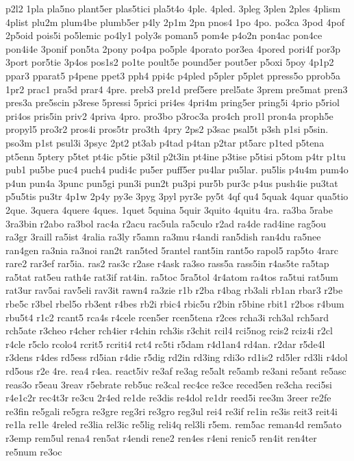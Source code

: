{p2l2
1pla
pla5no
plant5er
plas5tici
pla5t4o
4ple.
4pled.
3pleg
3plen
2ples
4plism
4plist
plu2m
plum4be
plumb5er
p4ly
2p1m
2pn
pnos4
1po
4po.
po3ca
3pod
4pof
2p5oid
pois5i
po5lemic
po4ly1
poly3s
poman5
pom4e
p4o2n
pon4ac
pon4ce
pon4i4e
3ponif
pon5ta
2pony
po4pa
po5ple
4porato
por3ea
4pored
pori4f
por3p
3port
por5tie
3p4os
pos1s2
po1te
poult5e
pound5er
pout5er
p5oxi
5poy
4p1p2
ppar3
pparat5
p4pene
ppet3
pph4
ppi4c
p4pled
p5pler
p5plet
ppress5o
pprob5a
1pr2
prac1
pra5d
prar4
4pre.
preb3
pre1d
pref5ere
prel5ate
3prem
pre5mat
pren3
pres3a
pre5scin
p3rese
5pressi
5prici
pri4es
4pri4m
pring5er
pring5i
4prio
p5riol
pri4os
pris5in
priv2
4priva
4pro.
pro3bo
p3roc3a
pro4ch
pro1l
pron4a
proph5e
propyl5
pro3r2
pros4i
pros5tr
pro3th
4pry
2ps2
p3sac
psal5t
p3sh
p1si
p5sin.
pso3m
p1st
psul3i
3psyc
2pt2
pt3ab
p4tad
p4tan
p2tar
pt5arc
p1ted
p5tena
pt5enn
5ptery
p5tet
pt4ic
p5tie
p3til
p2t3in
pt4ine
p3tise
p5tisi
p5tom
p4tr
p1tu
pub1
pu5be
puc4
puch4
pudi4c
pu5er
puff5er
pu4lar
pu5lar.
pu5lis
p4u4m
pum4o
p4un
pun4a
3punc
pun5gi
pun3i
pun2t
pu3pi
pur5b
pur3c
p4us
push4ie
pu3tat
p5u5tis
pu3tr
4p1w
2p4y
py3e
3pyg
3pyl
pyr3e
py5t
4qf
qu4
5quak
4quar
qua5tio
2que.
3quera
4quere
4ques.
1quet
5quina
5quir
3quito
4quitu
4ra.
ra3ba
5rabe
3ra3bin
r2abo
ra3bol
rac4a
r2acu
rac5ula
ra5culo
r2ad
ra4de
rad4ine
rag5ou
ra3gr
3raill
ra5ist
4ralia
ra3ly
r5amn
ra3mu
r4andi
ran5dish
ran4du
ra5nee
ran4gen
ra3nia
ra3noi
ran2t
ran5ted
5rantel
rant5in
rant5o
rapol5
rap5to
4rarc
rare2
rar3ef
rar5ia.
ras2
ras3c
r2ase
r4ask
ra3so
rass5a
rass5in
r4as5te
ra5tap
ra5tat
rat5eu
rath4e
rat3if
rat4in.
ra5toc
5ra5tol
4r4atom
ra4tos
ra5tui
rat5um
rat3ur
rav5ai
rav5eli
rav3it
rawn4
ra3zie
r1b
r2ba
r4bag
rb3ali
rb1an
rbar3
r2be
rbe5c
r3bel
rbel5o
rb3ent
r4bes
rb2i
rbic4
rbic5u
r2bin
r5bine
rbit1
r2bos
r4bum
rbu5t4
r1c2
rcant5
rca4s
r4cele
rcen5er
rcen5tena
r2ces
rcha3i
rch3al
rch5ard
rch5ate
r3cheo
r4cher
rch4ier
r4chin
rch3is
r3chit
rcil4
rci5nog
rcis2
rciz4i
r2cl
r4cle
r5clo
rcolo4
rcrit5
rcriti4
rct4
rc5ti
r5dam
r4d1an4
rd4an.
r2dar
r5de4l
r3dens
r4des
rd5ess
rd5ian
r4die
r5dig
rd2in
rd3ing
rdi3o
rd1is2
rd5ler
rd3li
r4dol
rd5ous
r2e
4re.
rea4
r4ea.
react5iv
re3af
re3ag
re5alt
re5amb
re3ani
re5ant
re5asc
reas3o
r5eau
3reav
r5ebrate
reb5uc
re3cal
rec4ce
re3ce
reced5en
re3cha
reci5si
r4e1c2r
rec4t3r
re3cu
2r4ed
re1de
re3dis
re4dol
re1dr
reed5i
ree3m
3reer
re2fe
re3fin
re5gali
re5gra
re3gre
reg3ri
re3gro
reg3ul
rei4
re3if
re1in
re3is
reit3
reit4i
re1la
re1le
4reled
re3lia
rel3ic
re5lig
reli4q
rel3li
r5em.
rem5ac
reman4d
rem5ato
r3emp
rem5ul
rena4
ren5at
r4endi
rene2
ren4es
r4eni
renic5
ren4it
ren4ter
re5num
re3oc
}
